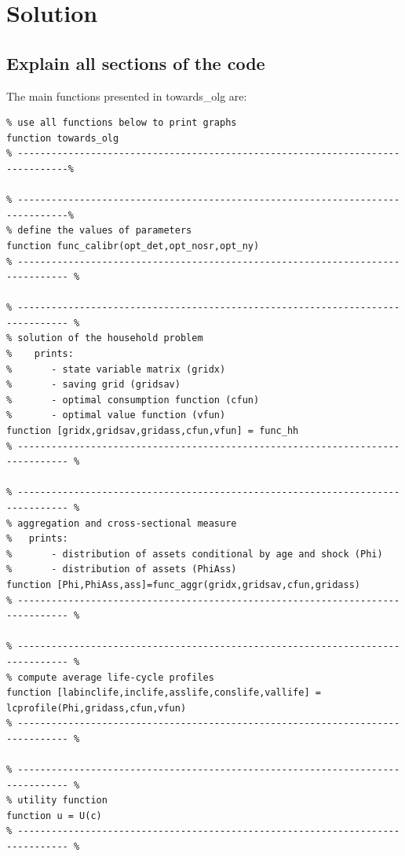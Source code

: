 \documentclass[12pt,a4paper]{article}
\begin{document}
\newpage


\section{Solution}

\subsection{Explain all sections of the code}

The main functions presented in {\selectfont towards\_olg} are:

\begin{lstlisting}[frame=single]
% -------------------------------------------------------------------------------%
% use all functions below to print graphs
function towards_olg
% -------------------------------------------------------------------------------%

% -------------------------------------------------------------------------------%
% define the values of parameters
function func_calibr(opt_det,opt_nosr,opt_ny)
% ------------------------------------------------------------------------------- %

% ------------------------------------------------------------------------------- %
% solution of the household problem
%    prints:
%       - state variable matrix (gridx)
%       - saving grid (gridsav)
%       - optimal consumption function (cfun)
%       - optimal value function (vfun)
function [gridx,gridsav,gridass,cfun,vfun] = func_hh
% ------------------------------------------------------------------------------- %

% ------------------------------------------------------------------------------- %
% aggregation and cross-sectional measure
%   prints:
%       - distribution of assets conditional by age and shock (Phi)
%       - distribution of assets (PhiAss)
function [Phi,PhiAss,ass]=func_aggr(gridx,gridsav,cfun,gridass)
% ------------------------------------------------------------------------------- %

% ------------------------------------------------------------------------------- %
% compute average life-cycle profiles
function [labinclife,inclife,asslife,conslife,vallife] = lcprofile(Phi,gridass,cfun,vfun)
% ------------------------------------------------------------------------------- %

% ------------------------------------------------------------------------------- %
% utility function
function u = U(c)
% ------------------------------------------------------------------------------- %
\end{lstlisting}
\end{document}

